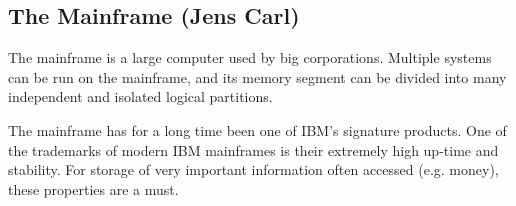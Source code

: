 \subsection{The Mainframe (Jens Carl)}

The mainframe is a large computer  used by big corporations. Multiple systems can be run on the mainframe, and its memory segment can be divided into many independent and isolated logical partitions.

The mainframe has for a long time been one of IBM's signature products\cite{ibm_history_slides}. One of the trademarks of modern IBM mainframes is their extremely high up-time and stability\cite{red_book}. For storage of very important information often accessed (e.g. money), these properties are a must. 
